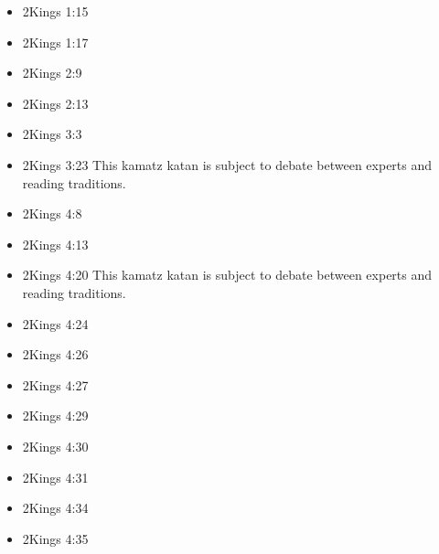 \documentclass[14pt]{article}
\begin{document}
\begin{multicols}{2}
\begin{itemize}
											\item 2Kings 1:15
											
											\item 2Kings 1:17
											
											\item 2Kings 2:9
											
											\item 2Kings 2:13
											
											\item 2Kings 3:3
											
											\item 2Kings 3:23 This kamatz katan is subject to debate between experts and reading traditions.
													
													\item 2Kings 4:8
													
													\item 2Kings 4:13
													
													\item 2Kings 4:20 This kamatz katan is subject to debate between experts and reading traditions.
													
													\item 2Kings 4:24
													
													\item 2Kings 4:26
													
													\item 2Kings 4:27
													
													\item 2Kings 4:29
													
													\item 2Kings 4:30
													
													\item 2Kings 4:31
													
													\item 2Kings 4:34
													
													\item 2Kings 4:35
													

\end{itemize}
\end{multicols}
\end{document}
